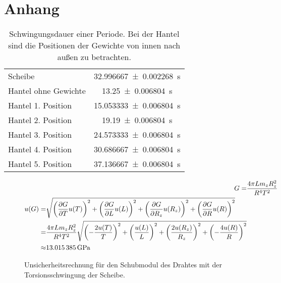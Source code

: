 \documentclass[11pt,a4paper,titlepage, ngerman]{article}
\begin{document}
	\newpage
	
	\section{Anhang}
	
	\begin{table}[h]
		\centering
		\caption{Schwingungsdauer einer Periode. Bei der Hantel sind die Positionen der Gewichte von innen nach außen zu betrachten.}
		\label{tab:schwingungsperioden}
		\begin{tabular}{l|S}
			\hline
			{Scheibe} & \SI{32,996667 +-0,002268}{\second}\\
			{Hantel ohne Gewichte} & \SI{13,25+-0,006804}{\second}\\
			{Hantel 1. Position} & \SI{15,053333+-0,006804}{\second}\\
			{Hantel 2. Position} & \SI{19,19+-0,006804}{\second}\\
			{Hantel 3. Position} & \SI{24,573333+-0,006804}{\second}\\
			{Hantel 4. Position} & \SI{30,686667+-0,006804}{\second}\\
			{Hantel 5. Position} & \SI{37,136667+-0,006804}{\second}\\
			\hline
		\end{tabular}
	\end{table}
	
	\begin{figure}[h]
		\centering
		\begin{align}
		G =& \frac{4\pi L m_z R_z^2}{R^4 T^2}\\
		\begin{split}
		\label{eq:G-unc}
		u(G) =& \sqrt{\left( \pdv{G}{T} u(T) \right) ^2 + \left( \pdv{G}{L} u(L) \right) ^2 + \left( \pdv{G}{R_z} u(R_z) \right) ^2 + \left( \pdv{G}{R} u(R) \right) ^2}\\
		=& \frac{4\pi L m_z R_z^2}{R^4 T^2} \sqrt{\left(-\frac{2u(T)}{T} \right) ^2 + \left( \frac{u(L)}{L} \right) ^2 + \left( \frac{2u(R_z)}{R_z} \right) ^2 + \left( -\frac{4u(R)}{R} \right) ^2}\\
		\approx & \SI{13,015385}{\giga\pascal}
		\end{split}
		\end{align}
		\caption{Unsicherheitsrechnung für den Schubmodul des Drahtes mit der Torsionsschwingung der Scheibe.}
	\end{figure}
	
\end{document}
